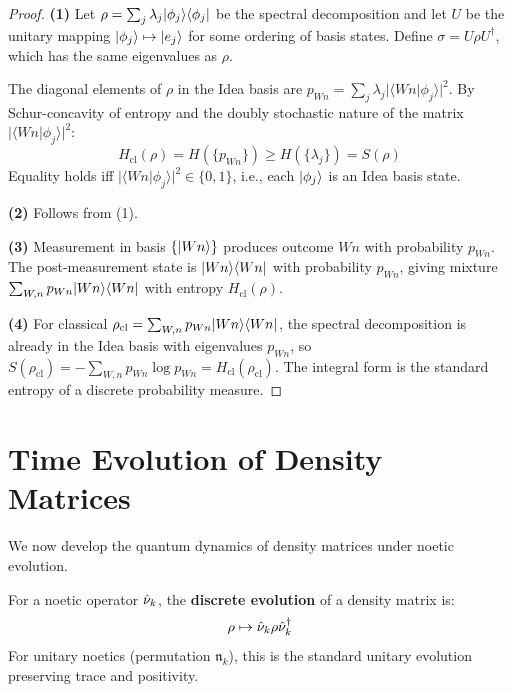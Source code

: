 \begin{proof}
\textbf{(1)} Let $\rho = \sum_j \lambda_j |\phi_j\rangle\langle \phi_j|$ be the spectral decomposition and let $U$ be the unitary mapping $|\phi_j\rangle \mapsto |e_j\rangle$ for some ordering of basis states. Define $\sigma = U\rho U^\dagger$, which has the same eigenvalues as $\rho$.

The diagonal elements of $\rho$ in the Idea basis are $p_{Wn} = \sum_j \lambda_j |\langle Wn | \phi_j \rangle|^2$. By Schur-concavity of entropy and the doubly stochastic nature of the matrix $|\langle Wn | \phi_j \rangle|^2$:
\[
H_{\mathrm{cl}}(\rho) = H(\{p_{Wn}\}) \geq H(\{\lambda_j\}) = S(\rho)
\]
Equality holds iff $|\langle Wn | \phi_j \rangle|^2 \in \{0, 1\}$, i.e., each $|\phi_j\rangle$ is an Idea basis state.

\textbf{(2)} Follows from (1).

\textbf{(3)} Measurement in basis $\{|Wn\rangle\}$ produces outcome $Wn$ with probability $p_{Wn}$. The post-measurement state is $|Wn\rangle\langle Wn|$ with probability $p_{Wn}$, giving mixture $\sum_{W,n} p_{Wn} |Wn\rangle\langle Wn|$ with entropy $H_{\mathrm{cl}}(\rho)$.

\textbf{(4)} For classical $\rho_{\mathrm{cl}} = \sum_{W,n} p_{Wn} |Wn\rangle\langle Wn|$, the spectral decomposition is already in the Idea basis with eigenvalues $p_{Wn}$, so $S(\rho_{\mathrm{cl}}) = -\sum_{W,n} p_{Wn} \log p_{Wn} = H_{\mathrm{cl}}(\rho_{\mathrm{cl}})$. The integral form is the standard entropy of a discrete probability measure.
\end{proof}

\section{Time Evolution of Density Matrices}
\label{sec:density-evolution}

We now develop the quantum dynamics of density matrices under noetic evolution.

\begin{definition}
\label{def:discrete-density-evolution}
For a noetic operator $\hat{\nu}_k$, the \textbf{discrete evolution} of a density matrix is:
\[
\rho \mapsto \hat{\nu}_k \rho \hat{\nu}_k^\dagger
\]
For unitary noetics (permutation $\mathfrak{n}_k$), this is the standard unitary evolution preserving trace and positivity.
\end{definition}

